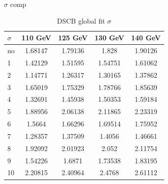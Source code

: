 \documentclass[10pt,UKenglish, leqno, xcolor = dvipsnames]{beamer}
\begin{document}
		\begin{frame}{$\sigma$ comp}
			\vfill
			\centering
			\begin{table}[tbp]
				\centering
				\begin{tabular}{lcccc}
					\toprule[1.5pt]
					$\sigma$	& 110 GeV	& 125 GeV	& 130 GeV	& 140 GeV	\\
					\midrule
					no & 1.68147 & 1.79136 & 1.828 & 1.90126 \\ 
					1 & 1.42129 & 1.51595 & 1.54751 & 1.61062 \\
					2 & 1.14771 & 1.26317 & 1.30165 & 1.37862 \\ 
					3 & 1.65019 & 1.75329 & 1.78766 & 1.85639 \\ 
					4 & 1.32691 & 1.45938 & 1.50353 & 1.59184 \\ 
					5 & 1.88956 & 2.06138 & 2.11865 & 2.23319 \\ 
					6 & 1.5664 & 1.66296 & 1.69514 & 1.75952 \\ 
					7 & 1.28357 & 1.37509 & 1.4056 & 1.46661 \\ 
					8 & 1.92092 & 2.01923 & 2.052 & 2.11754 \\ 
					9 & 1.54226 & 1.6871 & 1.73538 & 1.83195 \\ 
					10 & 2.20815 & 2.40964 & 2.4768 & 2.61112 \\ 
					\bottomrule[1.5pt]
				\end{tabular}
				\caption{DSCB global fit $\sigma$}
			\end{table}
			\vfill
		\end{frame}
	
\end{document}
